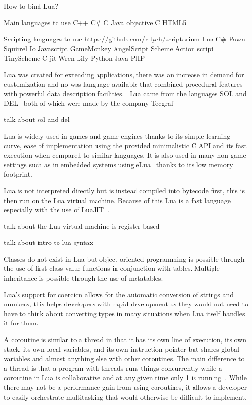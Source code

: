\documentclass[11pt,a4paper,titlepage]{article}
\begin{document}
	How to bind Lua?
			

	\newpage

	Main languages to use
	C++
	C\#
	C
	Java
	objective C
	HTML5
	
	Scripting languages to use https://github.com/r-lyeh/scriptorium
		Lua
		C\# %
		Pawn
		Squirrel
		Io
		Javascript
		GameMonkey
		AngelScript
		Scheme
		Action script
		TinyScheme
		C jit
		Wren
		Lily
		Python
		Java
		PHP

	\newpage

	Lua was created for extending applications, there was an increase in demand for customization and no was language available that combined procedural features with powerful data description facilities.~\cite{Ierusalimschy02software} Lua came from the languages SOL and DEL~\cite{Ierusalimschy01theevolution} both of which were made by the company Tecgraf.
	
	talk about sol and del
	
	Lua is widely used in games and game engines thanks to its simple learning curve, ease of implementation using the provided minimalistic C API and its fast execution when compared to similar languages. It is also used in many non game settings such as in embedded systems using eLua~\cite{eLua} thanks to its low memory footprint.
	
	Lua is not interpreted directly but is instead compiled into bytecode first, this is then run on the Lua virtual machine. Because of this Lua is a fast language especially with the use of LuaJIT~\cite{LuaJIT}.

	talk about the Lua virtual machine is register based

	talk about intro to lua syntax

	Classes do not exist in Lua but object oriented programming is possible through the use of first class value functions in conjunction with tables. Multiple inheritance is possible through the use of metatables.

	Lua's support for coercion allows for the automatic conversion of strings and numbers, this helps developers with rapid development as they would not need to have to think about converting types in many situations when Lua itself handles it for them.

	A coroutine is similar to a thread in that it has its own line of execution, its own stack, its own local variables, and its own instruction pointer but shares global variables and almost anything else with other coroutines. The main difference to a thread is that a program with threads runs things concurrently while a coroutine in Lua is collaborative and at any given time only 1 is running~\cite{Ierusalimschy:2013:PLT:2502646}. While there may not be a performance gain from using coroutines, it allows a developer to easily orchestrate multitasking that would otherwise be difficult to implement.
\end{document}
